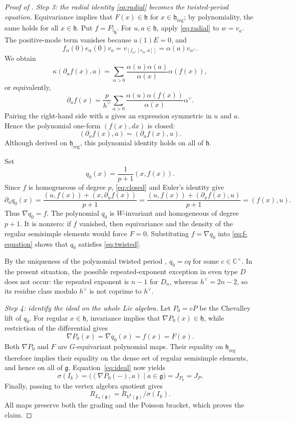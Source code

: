 \documentclass[11pt,reqno]{amsart}
\theoremstyle{remark}
\newcommand{\g}{\mathfrak g}
\newcommand{\h}{\mathfrak h}
\newcommand{\C}{\mathbb C}
\newcommand{\grad}{\nabla}
\begin{document}
\begin{proof}[Proof of ]
\medskip
\noindent
\emph{Step 3: the radial identity \eqref{eq:radial} becomes the
twisted-period equation.}
Equivariance implies that $F(x)\in\h$ for $x\in\h_{\mathrm{reg}}$;
by polynomiality, the same holds for all $x\in\h$. Put $f=F|_\h$.
For $u,a\in\h$, apply \eqref{eq:radial} to $w=v_a$. The positive-mode
term vanishes because $u(1)E=0$, and
\[
f_\alpha(0)e_\alpha(0)v_a
=
v_{[f_\alpha,[e_\alpha,a]]}
=
\alpha(a)v_{\alpha^\vee}.
\]
We obtain
\[
\kappa(\partial_uf(x),a)
=
\sum_{\alpha>0}
\frac{\alpha(u)\alpha(a)}{\alpha(x)}
\alpha(f(x)),
\]
or equivalently,
\begin{equation}
\label{eq:f-equation}
\partial_uf(x)
=
\frac{p}{h^\vee}
\sum_{\alpha>0}
\frac{\alpha(u)\alpha(f(x))}{\alpha(x)}
\alpha^\vee.
\end{equation}
Pairing the right-hand side with $a$ gives an expression symmetric
in $u$ and $a$. Hence the polynomial one-form $(f(x),dx)$ is closed:
\begin{equation}
\label{eq:closed}
(\partial_uf(x),a)
=
(\partial_af(x),u).
\end{equation}
Although derived on $\h_{\mathrm{reg}}$, this polynomial identity
holds on all of $\h$.

Set
\[
q_0(x)=\frac{1}{p+1}(x,f(x)).
\]
Since $f$ is homogeneous of degree $p$, \eqref{eq:closed} and Euler's
identity give
\[
\partial_u q_0(x)
=
\frac{(u,f(x))+(x,\partial_uf(x))}{p+1}
=
\frac{(u,f(x))+(\partial_xf(x),u)}{p+1}
=
(f(x),u).
\]
Thus $\grad q_0=f$. The polynomial $q_0$ is $W$-invariant and
homogeneous of degree $p+1$. It is nonzero: if $f$ vanished, then
equivariance and the density of the regular semisimple elements would
force $F=0$. Substituting $f=\grad q_0$ into
\eqref{eq:f-equation} shows that $q_0$ satisfies
\eqref{eq:twisted}.

By the uniqueness of the polynomial twisted period \cite{FS},
$q_0=cq$ for some $c\in\C^\times$. In the present situation, the
possible repeated-exponent exception in even type $D$ does not occur:
the repeated exponent is $n-1$ for $D_n$, whereas
$h^\vee=2n-2$, so its residue class modulo $h^\vee$ is not coprime to
$h^\vee$.

\medskip
\noindent
\emph{Step 4: identify the ideal on the whole Lie algebra.}
Let $P_0=cP$ be the Chevalley lift of $q_0$. For regular $x\in\h$,
invariance implies that $\grad P_0(x)\in\h$, while restriction of the
differential gives
\[
\grad P_0(x)
=
\grad q_0(x)
=
f(x)
=
F(x).
\]
Both $\grad P_0$ and $F$ are $G$-equivariant polynomial maps. Their
equality on $\h_{\mathrm{reg}}$ therefore implies their equality on
the dense set of regular semisimple elements, and hence on all of
$\g$. Equation~\eqref{eq:ideal} now yields
\[
\sigma(I_k)
=
\bigl((\grad P_0(-),a)\mid a\in\g\bigr)
=
J_{P_0}
=
J_P.
\]
Finally, passing to the vertex algebra quotient gives
\[
R_{L_k(\g)}
=
R_{V^k(\g)}/\sigma(I_k).
\]
All maps preserve both the grading and the Poisson bracket, which
proves the claim.
\end{proof}
\end{document}
